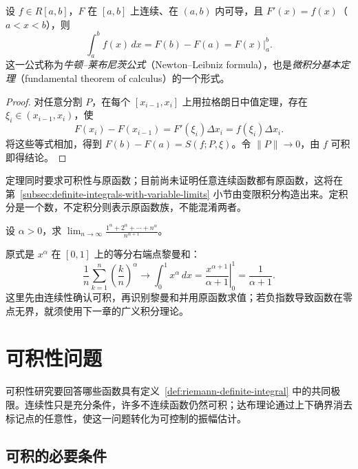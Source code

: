 \documentclass[UTF8,12pt,a4paper,fontset=fandol]{ctexbook}
\begin{document}
\begin{theorem}[牛顿--莱布尼茨公式]
\label{thm:newton-leibniz-integrable-antiderivative}
设 $f\in R[a,b]$，$F$ 在 $[a,b]$ 上连续、在 $(a,b)$ 内可导，且 $F'(x)=f(x)$（$a<x<b$），则
\begin{equation}
    \int_a^b f(x)\,dx=F(b)-F(a)
    =\left.F(x)\right|_a^b.
    \label{eq:newton-leibniz-formula}
\end{equation}
这一公式称为\emph{牛顿--莱布尼茨公式}（Newton--Leibniz formula），也是\emph{微积分基本定理}（fundamental theorem of calculus）的一个形式。
\end{theorem}
\begin{proof}
对任意分割 $P$，在每个 $[x_{i-1},x_i]$ 上用拉格朗日中值定理，存在 $\xi_i\in(x_{i-1},x_i)$，使
\[
    F(x_i)-F(x_{i-1})=F'(\xi_i)\Delta x_i=f(\xi_i)\Delta x_i.
\]
将这些等式相加，得到 $F(b)-F(a)=S(f;P,\xi)$。令 $\|P\|\to0$，由 $f$ 可积即得结论。
\end{proof}

定理同时要求可积性与原函数；目前尚未证明任意连续函数都有原函数，这将在第~\ref{subsec:definite-integrals-with-variable-limits} 小节由变限积分构造出来。定积分是一个数，不定积分则表示原函数族，不能混淆两者。

\begin{example}
\label{ex:power-sum-limit-by-integral}
设 $\alpha>0$，求 $\displaystyle\lim_{n\to\infty}\frac{1^\alpha+2^\alpha+\cdots+n^\alpha}{n^{\alpha+1}}$。
\end{example}
\begin{solve}
原式是 $x^\alpha$ 在 $[0,1]$ 上的等分右端点黎曼和：
\[
    \frac1n\sum_{k=1}^n\left(\frac kn\right)^\alpha
    \longrightarrow\int_0^1x^\alpha\,dx
    =\left.\frac{x^{\alpha+1}}{\alpha+1}\right|_0^1
    =\frac1{\alpha+1}.
\]
这里先由连续性确认可积，再识别黎曼和并用原函数求值；若负指数导致函数在零点无界，就须使用下一章的广义积分理论。
\end{solve}

\section{可积性问题}
\label{sec:integrability}

可积性研究要回答哪些函数具有定义~\ref{def:riemann-definite-integral} 中的共同极限。连续性只是充分条件，许多不连续函数仍然可积；达布理论通过上下确界消去标记点的任意性，使这一问题转化为可控制的振幅估计。

\subsection{可积的必要条件}
\label{subsec:necessary-conditions-for-integrability}
\end{document}
